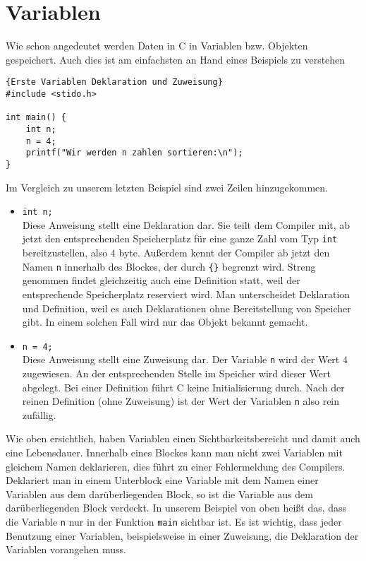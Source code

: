 \section{Variablen}

Wie schon angedeutet werden Daten in C in Variablen bzw. Objekten gespeichert.
Auch dies ist am einfachsten an Hand eines Beispiels zu verstehen
\begin{lstlisting}{Erste Variablen Deklaration und Zuweisung}
#include <stido.h>

int main() {
    int n;
    n = 4;
    printf("Wir werden n zahlen sortieren:\n");
}
\end{lstlisting}
Im Vergleich zu unserem letzten Beispiel sind zwei Zeilen hinzugekommen. 
\begin{itemize}
\item \texttt{int n;}\\
  Diese Anweisung stellt eine Deklaration dar. 
  Sie teilt dem Compiler mit, ab jetzt den entsprechenden Speicherplatz für eine ganze Zahl vom Typ \texttt{int} bereitzustellen, also $4$ byte.
  Außerdem kennt der Compiler ab jetzt den Namen \texttt{n} innerhalb des Blockes, der durch \texttt{\{\}} begrenzt wird.
  Streng genommen findet gleichzeitig auch eine Definition statt, weil der entsprechende Speicherplatz reserviert wird. 
  Man unterscheidet Deklaration und Definition, weil es auch Deklarationen ohne Bereitstellung von Speicher gibt.
  In einem solchen Fall wird nur das Objekt bekannt gemacht.

\item \verb|n = 4;|\\
  Diese Anweisung stellt eine Zuweisung dar.
  Der Variable \texttt{n} wird der Wert $4$ zugewiesen.
  An der entsprechenden Stelle im Speicher wird dieser Wert abgelegt.
  Bei einer Definition führt C keine Initialisierung durch.
  Nach der reinen Definition (ohne Zuweisung) ist der Wert der Variablen \texttt{n} also rein zufällig.
\end{itemize}
Wie oben ersichtlich, haben Variablen einen Sichtbarkeitsbereicht und damit auch eine Lebensdauer.
Innerhalb eines Blockes kann man nicht zwei Variablen mit gleichem Namen deklarieren, dies führt zu einer Fehlermeldung des Compilers.
Deklariert man in einem Unterblock eine Variable mit dem Namen einer Variablen aus dem darüberliegenden Block, so ist die Variable aus dem darüberliegenden Block verdeckt.
In unserem Beispiel von oben heißt das, dass die Variable \texttt{n} nur in der Funktion \texttt{main} sichtbar ist. 
Es ist wichtig, dass jeder Benutzung einer Variablen, beispielsweise in einer Zuweisung, die Deklaration der Variablen vorangehen muss.
